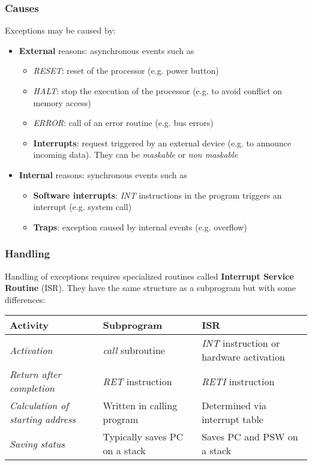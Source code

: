 \subsubsection{Causes}
Exceptions may be caused by:
\begin{itemize}
	\item \textbf{External} reasons: asynchronous events such as
	\begin{itemize}
		\item \textit{RESET}: reset of the processor (e.g. power button)
		\item \textit{HALT}: stop the execution of the processor (e.g. to avoid conflict on memory access)
		\item \textit{ERROR}: call of an error routine (e.g. bus errors)
		\item \textbf{Interrupts}: request triggered by an external device (e.g. to announce incoming data). They can be \textit{maskable} or \textit{non maskable}
	\end{itemize}
	\item \textbf{Internal} reasons: synchronous events such as
	\begin{itemize}
		\item \textbf{Software interrupts}: \textit{INT} instructions in the program triggers an interrupt (e.g. system call)
		\item \textbf{Traps}: exception caused by internal events (e.g. overflow)
	\end{itemize}
\end{itemize}
\newpage
\subsubsection{Handling}
Handling of exceptions requires specialized routines called \textbf{Interrupt Service Routine} (ISR). They have the same structure as a subprogram but with some differences:
\begin{table}[!h]
	\centering
	\begin{tabular}{|p{2cm}|p{3cm}|p{3.5cm}|}
		\hline
		\textbf{Activity} & \textbf{Subprogram} & \textbf{ISR} \\
		\hline
		\textit{Activation} & \textit{call} subroutine & \textit{INT} instruction or hardware activation\\
		\hline
		\textit{Return after completion} & \textit{RET} instruction & \textit{RETI} instruction \\
		\hline
		\textit{Calculation of starting address} & Written in calling program & Determined via interrupt table \\
		\hline
		\textit{Saving status} & Typically saves PC on a stack & Saves PC and PSW on a stack\\
		\hline
	\end{tabular}
\end{table}

